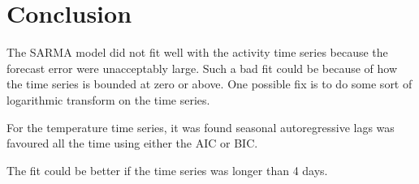 \documentclass[a4paper]{proc}
\begin{document}
\section{Conclusion}
The SARMA model did not fit well with the activity time series because the forecast error were unacceptably large. Such a bad fit could be because of how the time series is bounded at zero or above. One possible fix is to do some sort of logarithmic transform on the time series.

For the temperature time series, it was found seasonal autoregressive lags was favoured all the time using either the AIC or BIC.

The fit could be better if the time series was longer than 4 days.
\end{document}

